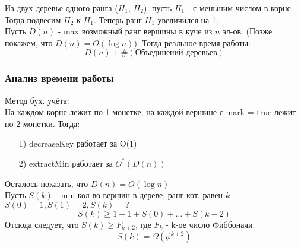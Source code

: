    Из двух деревье одного ранга ($H_1$, $H_2$), пусть $H_1$ - с меньшим числом в корне. Тогда подвесим $H_2$ к $H_1$. Теперь ранг $H_1$ увеличился на 1. \\

   Пусть $D(n)$ - max возможный ранг вершины в куче из $n$ эл-ов. (Позже покажем, что $D(n) = O(\log n)$). Тогда реальное время работы:
   \[
     D(n) + \#(\text{Объединений деревьев})
   \]

\subsubsection{Анализ времени работы}
Метод бух. учёта: \\

На каждом корне лежит по 1 монетке, на каждой вершине с mark = true лежит по 2 монетки. \underline{Тогда}:
\begin{itemize}
  \item [1) ] decreaseKey работает за O(1)
  \item [2) ] extractMin работает за $O^{*}(D(n))$
\end{itemize}
Осталось показать, что $D(n) = O(\log n)$ \\

Пусть $S(k)$ - min кол-во вершин в дереве, ранг кот. равен $k$ \\
$S(0) = 1, S(1) = 2, S(k) = ?$
\[
S(k) \geq 1 + 1 + S(0) + \ldots + S(k - 2)
\]
Отсюда следует, что $S(k) \geq F_{k + 2}$, где $F_k$ - k-ое число Фиббоначи.
\[
S(k) = \Omega(\phi^{k + 2})
\]
